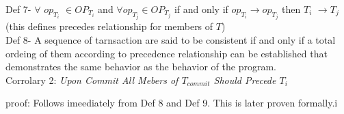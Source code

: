 \documentclass[a4paper, 11pt]{article}
\begin{document}

Def 7- $\forall$ $op_{T_i}$ $\in OP_{T_i}$ and $\forall op_{T_j}\in OP_{T_j}$ if and only if $op_{T_i} \rightarrow op_{T_j}$ then $T_i$ $\rightarrow T_j$ \hspace{8mm} (this defines precedes relationship for members of $T$) \\

Def 8- A sequence of tarnsaction are said to be consistent if and only if a total ordeing of them according to precedence relationship can be established that demonstrates the same behavior as the behavior of the program.\\ 

Corrolary 2: \emph{Upon Commit All Mebers of $T_{commit}$ Should Precede $T_i$}

proof: Follows imeediately from Def 8 and Def 9. This is later proven formally.i\\

\end{document}
